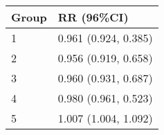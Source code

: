 \begin{tabular}{ll}
  \hline
Group & RR (96\%CI) \\ 
  \hline
   1 & 0.961 (0.924, 0.385) \\ 
     2 & 0.956 (0.919, 0.658) \\ 
     3 & 0.960 (0.931, 0.687) \\ 
     4 & 0.980 (0.961, 0.523) \\ 
     5 & 1.007 (1.004, 1.092) \\ 
   \hline
\end{tabular}

